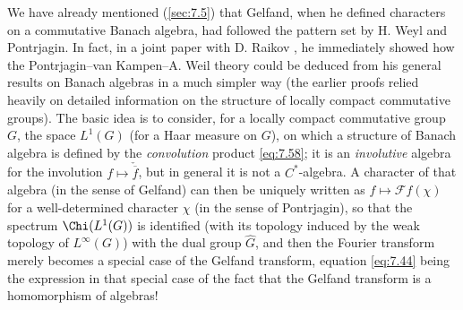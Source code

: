 \documentclass[12pt,a4paper,leqno,twoside]{extbook}
\begin{document}
We have already mentioned (\ref{sec:7.5}) that Gelfand, when he defined characters on a commutative Banach algebra, had followed the pattern set by H. Weyl and Pontrjagin. In fact, in a joint paper with D. Raikov \cite{086}, he immediately showed how the Pontrjagin--van Kampen--A. Weil theory could be deduced from his general results on Banach algebras in a much simpler way (the earlier proofs relied heavily on detailed information on the structure of locally compact commutative groups). The basic idea is to consider, for a locally compact commutative group \(G\), the space \(L^1(G)\) (for a Haar measure on \(G\)), on which a structure of Banach algebra is defined by the \emph{convolution} product \eqref{eq:7.58}; it is an \emph{involutive} algebra for the involution \(f \mapsto \check{\overline{f}}\), but in general it is not a \(C^*\)-algebra. A character of that algebra (in the sense of Gelfand) can then be uniquely written as \(f \mapsto \mathcal{F}f(\chi)\) for a well-determined character \(\chi\) (in the sense of Pontrjagin), so that the spectrum \(\Chi(L^1(G))\) is identified (with its topology induced by the weak topology of \(L^\infty(G)\)) with the dual group \(\hat{G}\), and then the Fourier transform merely becomes a special case of the Gelfand transform, equation \eqref{eq:7.44} being the expression in that special case of the fact that the Gelfand transform is a homomorphism of algebras!
\end{document}
